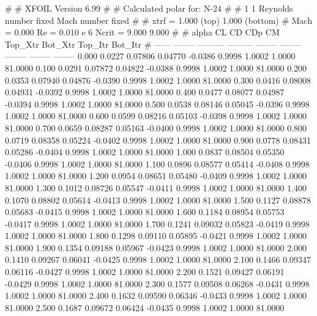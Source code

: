 #  
#       XFOIL         Version 6.99
#  
# Calculated polar for: N-24                                            
#  
# 1 1 Reynolds number fixed          Mach number fixed         
#  
# xtrf =   1.000 (top)        1.000 (bottom)  
# Mach =   0.000     Re =     0.010 e 6     Ncrit =   9.000  9.000
#  
#   alpha    CL        CD       CDp       CM     Top_Xtr  Bot_Xtr  Top_Itr  Bot_Itr
#  ------ -------- --------- --------- -------- -------- -------- -------- --------
   0.000   0.0227   0.07806   0.04770  -0.0386   0.9998   1.0002   1.0000  81.0000
   0.100   0.0291   0.07872   0.04822  -0.0388   0.9998   1.0002   1.0000  81.0000
   0.200   0.0353   0.07940   0.04876  -0.0390   0.9998   1.0002   1.0000  81.0000
   0.300   0.0416   0.08008   0.04931  -0.0392   0.9998   1.0002   1.0000  81.0000
   0.400   0.0477   0.08077   0.04987  -0.0394   0.9998   1.0002   1.0000  81.0000
   0.500   0.0538   0.08146   0.05045  -0.0396   0.9998   1.0002   1.0000  81.0000
   0.600   0.0599   0.08216   0.05103  -0.0398   0.9998   1.0002   1.0000  81.0000
   0.700   0.0659   0.08287   0.05163  -0.0400   0.9998   1.0002   1.0000  81.0000
   0.800   0.0719   0.08358   0.05224  -0.0402   0.9998   1.0002   1.0000  81.0000
   0.900   0.0778   0.08431   0.05286  -0.0404   0.9998   1.0002   1.0000  81.0000
   1.000   0.0837   0.08504   0.05350  -0.0406   0.9998   1.0002   1.0000  81.0000
   1.100   0.0896   0.08577   0.05414  -0.0408   0.9998   1.0002   1.0000  81.0000
   1.200   0.0954   0.08651   0.05480  -0.0409   0.9998   1.0002   1.0000  81.0000
   1.300   0.1012   0.08726   0.05547  -0.0411   0.9998   1.0002   1.0000  81.0000
   1.400   0.1070   0.08802   0.05614  -0.0413   0.9998   1.0002   1.0000  81.0000
   1.500   0.1127   0.08878   0.05683  -0.0415   0.9998   1.0002   1.0000  81.0000
   1.600   0.1184   0.08954   0.05753  -0.0417   0.9998   1.0002   1.0000  81.0000
   1.700   0.1241   0.09032   0.05823  -0.0419   0.9998   1.0002   1.0000  81.0000
   1.800   0.1298   0.09110   0.05895  -0.0421   0.9998   1.0002   1.0000  81.0000
   1.900   0.1354   0.09188   0.05967  -0.0423   0.9998   1.0002   1.0000  81.0000
   2.000   0.1410   0.09267   0.06041  -0.0425   0.9998   1.0002   1.0000  81.0000
   2.100   0.1466   0.09347   0.06116  -0.0427   0.9998   1.0002   1.0000  81.0000
   2.200   0.1521   0.09427   0.06191  -0.0429   0.9998   1.0002   1.0000  81.0000
   2.300   0.1577   0.09508   0.06268  -0.0431   0.9998   1.0002   1.0000  81.0000
   2.400   0.1632   0.09590   0.06346  -0.0433   0.9998   1.0002   1.0000  81.0000
   2.500   0.1687   0.09672   0.06424  -0.0435   0.9998   1.0002   1.0000  81.0000
